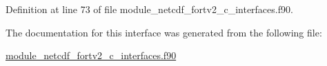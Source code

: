 Definition at line 73 of file module\+\_\+netcdf\+\_\+fortv2\+\_\+c\+\_\+interfaces.\+f90.



The documentation for this interface was generated from the following file\+:\begin{DoxyCompactItemize}
\item 
\hyperlink{module__netcdf__fortv2__c__interfaces_8f90}{module\+\_\+netcdf\+\_\+fortv2\+\_\+c\+\_\+interfaces.\+f90}\end{DoxyCompactItemize}

